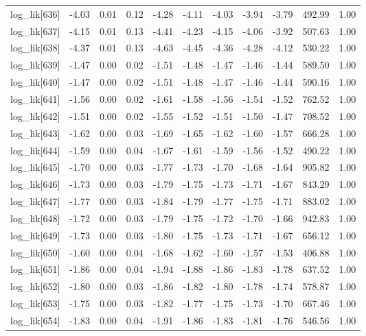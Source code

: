 \begin{table}[ht]
\begin{tabular}{rrrrrrrrrrr}
  log\_lik[636] & -4.03 & 0.01 & 0.12 & -4.28 & -4.11 & -4.03 & -3.94 & -3.79 & 492.99 & 1.00 \\ 
  log\_lik[637] & -4.15 & 0.01 & 0.13 & -4.41 & -4.23 & -4.15 & -4.06 & -3.92 & 507.63 & 1.00 \\ 
  log\_lik[638] & -4.37 & 0.01 & 0.13 & -4.63 & -4.45 & -4.36 & -4.28 & -4.12 & 530.22 & 1.00 \\ 
  log\_lik[639] & -1.47 & 0.00 & 0.02 & -1.51 & -1.48 & -1.47 & -1.46 & -1.44 & 589.50 & 1.00 \\ 
  log\_lik[640] & -1.47 & 0.00 & 0.02 & -1.51 & -1.48 & -1.47 & -1.46 & -1.44 & 590.16 & 1.00 \\ 
  log\_lik[641] & -1.56 & 0.00 & 0.02 & -1.61 & -1.58 & -1.56 & -1.54 & -1.52 & 762.52 & 1.00 \\ 
  log\_lik[642] & -1.51 & 0.00 & 0.02 & -1.55 & -1.52 & -1.51 & -1.50 & -1.47 & 708.52 & 1.00 \\ 
  log\_lik[643] & -1.62 & 0.00 & 0.03 & -1.69 & -1.65 & -1.62 & -1.60 & -1.57 & 666.28 & 1.00 \\ 
  log\_lik[644] & -1.59 & 0.00 & 0.04 & -1.67 & -1.61 & -1.59 & -1.56 & -1.52 & 490.22 & 1.00 \\ 
  log\_lik[645] & -1.70 & 0.00 & 0.03 & -1.77 & -1.73 & -1.70 & -1.68 & -1.64 & 905.82 & 1.00 \\ 
  log\_lik[646] & -1.73 & 0.00 & 0.03 & -1.79 & -1.75 & -1.73 & -1.71 & -1.67 & 843.29 & 1.00 \\ 
  log\_lik[647] & -1.77 & 0.00 & 0.03 & -1.84 & -1.79 & -1.77 & -1.75 & -1.71 & 883.02 & 1.00 \\ 
  log\_lik[648] & -1.72 & 0.00 & 0.03 & -1.79 & -1.75 & -1.72 & -1.70 & -1.66 & 942.83 & 1.00 \\ 
  log\_lik[649] & -1.73 & 0.00 & 0.03 & -1.80 & -1.75 & -1.73 & -1.71 & -1.67 & 656.12 & 1.00 \\ 
  log\_lik[650] & -1.60 & 0.00 & 0.04 & -1.68 & -1.62 & -1.60 & -1.57 & -1.53 & 406.88 & 1.00 \\ 
  log\_lik[651] & -1.86 & 0.00 & 0.04 & -1.94 & -1.88 & -1.86 & -1.83 & -1.78 & 637.52 & 1.00 \\ 
  log\_lik[652] & -1.80 & 0.00 & 0.03 & -1.86 & -1.82 & -1.80 & -1.78 & -1.74 & 578.87 & 1.00 \\ 
  log\_lik[653] & -1.75 & 0.00 & 0.03 & -1.82 & -1.77 & -1.75 & -1.73 & -1.70 & 667.46 & 1.00 \\ 
  log\_lik[654] & -1.83 & 0.00 & 0.04 & -1.91 & -1.86 & -1.83 & -1.81 & -1.76 & 546.56 & 1.00 \\ 

\end{tabular}
\end{table}

